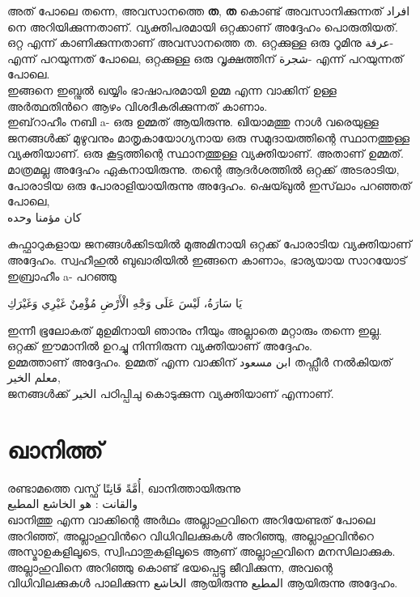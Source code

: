    അത് പോലെ തന്നെ, അവസാനത്തെ \textbf{ത}, \textbf{ത} കൊണ്ട് അവസാനിക്കുന്നത് \textarabic{افراد} നെ അറിയിക്കുന്നതാണ്. വ്യക്തിപരമായി ഒറ്റക്കാണ് അദ്ദേഹം പൊരുതിയത്. ഒറ്റ എന്ന് കാണിക്കുന്നതാണ് അവസാനത്തെ ത. ഒറ്റക്കുള്ള ഒരു റൂമിനു \textarabic{عرفة}- എന്ന് പറയുന്നത് പോലെ, ഒറ്റക്കുള്ള ഒരു വൃക്ഷത്തിന് \textarabic{شجرة}- എന്ന് പറയുന്നത് പോലെ. \\
     ഇങ്ങനെ ഇബ്നുൽ ഖയ്യിം ഭാഷാപരമായി ഉമ്മ എന്ന വാക്കിന് ഉള്ള അർത്ഥതിൻറെ ആഴം വിശദീകരിക്കുന്നത് കാണാം.\\
   
   
    ഇബ്‌റാഹീം നബി a- ഒരു ഉമ്മത് ആയിരുന്നു. ഖിയാമത്തു നാൾ വരെയുള്ള ജനങ്ങൾക്ക് മുഴുവനും  മാതൃകായോഗ്യനായ ഒരു സമുദായത്തിന്റെ സ്ഥാനത്തുള്ള വ്യക്തിയാണ്. ഒരു കൂട്ടത്തിന്റെ  സ്ഥാനത്തുള്ള വ്യക്തിയാണ്. അതാണ് ഉമ്മത്. \\
      
     
 മാത്രമല്ല അദ്ദേഹം ഏകനായിരുന്നു.  തന്റെ ആദർശത്തിൽ ഒറ്റക്ക് അടരാടിയ, പോരാടിയ ഒരു പോരാളിയായിരുന്നു അദ്ദേഹം. ഷെയ്ഖുൽ ഇസ്‌ലാം പറഞ്ഞത് പോലെ, \\
 \textarabic{كان مؤمنا وحده} 

കുഫ്ഫാറുകളായ ജനങ്ങൾക്കിടയിൽ മുഅമിനായി ഒറ്റക്ക് പോരാടിയ വ്യക്തിയാണ് അദ്ദേഹം. സ്വഹീഹുൽ ബുഖാരിയിൽ ഇങ്ങനെ കാണാം, ഭാര്യയായ സാറയോട് ഇബ്രാഹീം a- പറഞ്ഞു  

\textarabic{يَا سَارَةُ، لَيْسَ عَلَى وَجْهِ الْأَرْضِ مُؤْمِنٌ غَيْرِي وَغَيْرَكِ}

ഇന്നീ ഭൂലോകത് മുഉമിനായി ഞാനും നീയും അല്ലാതെ മറ്റാരും തന്നെ ഇല്ല. ഒറ്റക്ക് ഈമാനിൽ ഉറച്ചു നിന്നിരുന്ന വ്യക്തിയാണ് അദ്ദേഹം. \\

ഉമ്മത്താണ് അദ്ദേഹം. ഉമ്മത് എന്ന വാക്കിന് \textarabic{ابن مسعود} തഫ്സീർ നൽകിയത് \textarabic{معلم الخير}, \\
  ജനങ്ങൾക്ക് \textarabic{ الخير} പഠിപ്പിചു കൊടുക്കുന്ന വ്യക്തിയാണ് എന്നാണ്. \\
  
 \section*{\textmalayalam{ഖാനിത്ത്}}

രണ്ടാമത്തെ വസ്ഫ് \textarabic{ أُمَّةً قَانِتًا},  ഖാനിത്തായിരുന്നു  \\
 \textarabic{والقانت : هو الخاشع المطيع} \\
 ഖാനിത്തു എന്ന വാക്കിന്റെ അർഥം അല്ലാഹുവിനെ അറിയേണ്ടത് പോലെ അറിഞ്ഞ്, അല്ലാഹുവിൻറെ വിധിവിലക്കുകൾ അറിഞ്ഞു, അല്ലാഹുവിൻറെ അസ്മാഉകളിലൂടെ, സ്വിഫാതുകളിലൂടെ ആണ്  അല്ലാഹുവിനെ മനസിലാക്കുക. അല്ലാഹുവിനെ അറിഞ്ഞു കൊണ്ട് ഭയപ്പെട്ടു ജീവിക്കുന്ന, അവന്റെ വിധിവിലക്കുകൾ പാലിക്കുന്ന \textarabic{الخاشع} ആയിരുന്നു \textarabic{المطيع} ആയിരുന്നു അദ്ദേഹം.\\
 
